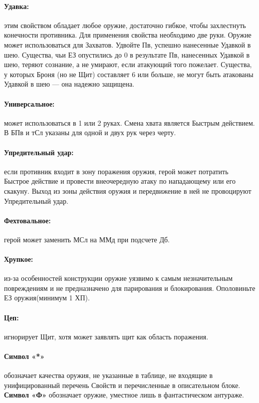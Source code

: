 \paragraph{Удавка:} этим свойством обладает любое оружие, достаточно гибкое, чтобы захлестнуть конечности противника. Для применения свойства необходимо две руки. Оружие может использоваться для Захватов. Удвойте Пв, успешно нанесенные Удавкой в шею. Существа, чьи ЕЗ опустились до 0 в результате Пв, нанесенных Удавкой в шею, теряют сознание, а не умирают, если атакующий того пожелает. Существа, у которых Броня (но не Щит) составляет 6 или больше, не могут быть атакованы Удавкой в шею — она надежно защищена.
\paragraph{Универсальное:} может использоваться в 1 или 2 руках. Смена хвата является Быстрым действием. В БПв и тСл указаны для одной и двух рук через черту.
\paragraph{Упредительный удар:} если противник входит в зону поражения оружия, герой может потратить Быстрое действие и провести внеочередную атаку по нападающему или его скакуну. Выход из зоны действия оружия и передвижение в ней не провоцируют Упредительный удар.
\paragraph{Фехтовальное:} герой может заменить МСл на ММд при подсчете Дб.
\paragraph{Хрупкое:} из-за особенностей конструкции оружие уязвимо к самым незначительным повреждениям и не предназначено для парирования и блокирования. Ополовиньте ЕЗ оружия(минимум 1 ХП).
\paragraph{Цеп:} игнорирует Щит, хотя может заявлять щит как область поражения.
\paragraph{Символ «*»} обозначает качества оружия, не указанные в таблице, не входящие в унифицированный перечень Свойств и перечисленные в описательном блоке. \textbf{Символ «Ф»} обозначает оружие, уместное лишь в фантастическом антураже.